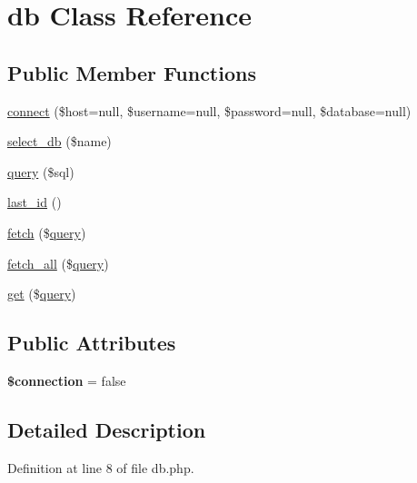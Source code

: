 \hypertarget{classdb}{\section{db Class Reference}
\label{classdb}
}
\subsection*{Public Member Functions}
\begin{DoxyCompactItemize}
\item 
\hyperlink{classdb_aa53805c5899dbfcac4625ab0e2820f26}{connect} (\$host=null, \$username=null, \$password=null, \$database=null)
\item 
\hyperlink{classdb_afff76d795eed804416c22a05edee728a}{select\-\_\-db} (\$name)
\item 
\hyperlink{classdb_abd50f30bb594fed70607832460a9f03a}{query} (\$sql)
\item 
\hyperlink{classdb_a16e41aaa21e888762ed641f9571bec06}{last\-\_\-id} ()
\item 
\hyperlink{classdb_a6cd321cd157312e66de11c242d27d268}{fetch} (\$\hyperlink{classdb_abd50f30bb594fed70607832460a9f03a}{query})
\item 
\hyperlink{classdb_a1b694dba4e7402729ebec08a466a9de9}{fetch\-\_\-all} (\$\hyperlink{classdb_abd50f30bb594fed70607832460a9f03a}{query})
\item 
\hyperlink{classdb_a4c8cb845fd6b4d2784424e2026d3a6cb}{get} (\$\hyperlink{classdb_abd50f30bb594fed70607832460a9f03a}{query})
\end{DoxyCompactItemize}
\subsection*{Public Attributes}
\begin{DoxyCompactItemize}
\item 
\hypertarget{classdb_afda49e13c635218bb190bcf61c82797d}{{\bfseries \$connection} = false}\label{classdb_afda49e13c635218bb190bcf61c82797d}

\end{DoxyCompactItemize}


\subsection{Detailed Description}


Definition at line 8 of file db.\-php.



